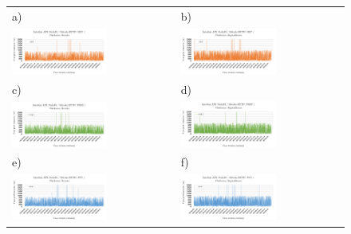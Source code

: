 \begin{figure}[htb]
  \advance\leftskip-1.7cm
	\begin{tabular}{@{}ll@{}}
    a) & b) \\
    \includegraphics[width=0.6\textwidth]{rys05/nodejs-get-heroku.pdf} & \includegraphics[width=0.6\textwidth]{rys05/nodejs-get-digitalocean.pdf} \\
    c) & d) \\
    \includegraphics[width=0.6\textwidth]{rys05/nodejs-post-heroku.pdf} & \includegraphics[width=0.6\textwidth]{rys05/nodejs-post-digitalocean.pdf} \\
    e) & f) \\
    \includegraphics[width=0.6\textwidth]{rys05/nodejs-put-heroku.pdf} & \includegraphics[width=0.6\textwidth]{rys05/nodejs-put-digitalocean.pdf} \\

\end{tabular}
\end{figure}
